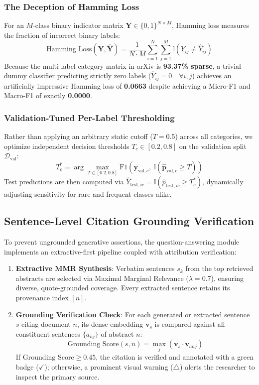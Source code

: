 \documentclass[journal]{IEEEtran}
\begin{document}
\subsubsection{The Deception of Hamming Loss}
For an $M$-class binary indicator matrix $\mathbf{Y} \in \{0, 1\}^{N \times M}$, Hamming loss measures the fraction of incorrect binary labels:
\begin{equation}
\text{Hamming Loss}(\mathbf{Y}, \hat{\mathbf{Y}}) = \frac{1}{N \cdot M} \sum_{i=1}^N \sum_{j=1}^M \mathbb{I}(Y_{ij} \ne \hat{Y}_{ij})
\end{equation}
Because the multi-label category matrix in arXiv is \textbf{93.37\% sparse}, a trivial dummy classifier predicting strictly zero labels ($\hat{Y}_{ij} = 0 \quad \forall i, j$) achieves an artificially impressive Hamming loss of \textbf{0.0663} despite achieving a Micro-F1 and Macro-F1 of exactly \textbf{0.0000}.

\subsubsection{Validation-Tuned Per-Label Thresholding}
Rather than applying an arbitrary static cutoff ($T = 0.5$) across all categories, we optimize independent decision thresholds $T_c \in [0.2, 0.8]$ on the validation split $\mathcal{D}_{\text{val}}$:
\begin{equation}
T_c^* = \arg\max_{T \in [0.2, 0.8]} \text{F1}\left(\mathbf{y}_{\text{val}, c}, \ \mathbb{I}(\hat{\mathbf{p}}_{\text{val}, c} \ge T)\right)
\end{equation}
Test predictions are then computed via $\hat{Y}_{\text{test}, ic} = \mathbb{I}(\hat{p}_{\text{test}, ic} \ge T_c^*)$, dynamically adjusting sensitivity for rare and frequent classes alike.

\subsection{Sentence-Level Citation Grounding Verification}
To prevent ungrounded generative assertions, the question-answering module implements an extractive-first pipeline coupled with attribution verification:
\begin{enumerate}
    \item \textbf{Extractive MMR Synthesis}: Verbatim sentences $s_k$ from the top retrieved abstracts are selected via Maximal Marginal Relevance ($\lambda = 0.7$), ensuring diverse, quote-grounded coverage. Every extracted sentence retains its provenance index $[n]$.
    \item \textbf{Grounding Verification Check}: For each generated or extracted sentence $s$ citing document $n$, its dense embedding $\mathbf{v}_s$ is compared against all constituent sentences $\{a_{nj}\}$ of abstract $n$:
    \begin{equation}
        \text{Grounding Score}(s, n) = \max_j (\mathbf{v}_s \cdot \mathbf{v}_{anj})
    \end{equation}
    If $\text{Grounding Score} \ge 0.45$, the citation is verified and annotated with a green badge ($\checkmark$); otherwise, a prominent visual warning ($\triangle$) alerts the researcher to inspect the primary source.
\end{enumerate}
\end{document}
